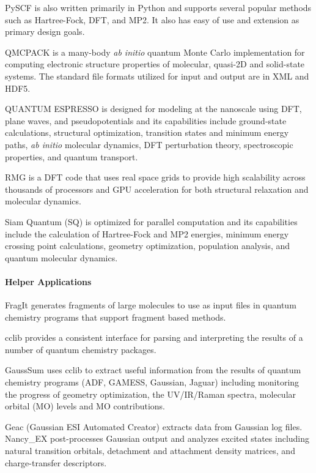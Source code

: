 PySCF is also written primarily in Python and supports several popular methods such as Hartree-Fock, DFT, and MP2. It also has easy of use and extension as primary design goals.

QMCPACK \cite{kim2010quantum} is a many-body \textit{ab initio} quantum Monte Carlo implementation for computing electronic structure properties of molecular, quasi-2D and solid-state systems. The standard file formats utilized for input and output are in XML and HDF5.

QUANTUM ESPRESSO \cite{Giannozzi_2009} is designed for modeling at the nanoscale using DFT, plane waves, and pseudopotentials and its capabilities include ground-state calculations, structural optimization, transition states and minimum energy paths, \textit{ab initio} molecular dynamics, DFT perturbation theory, spectroscopic properties, and quantum transport.

RMG \cite{moore2012scaling} is a DFT code that uses real space grids to provide high scalability across thousands of processors and GPU acceleration for both structural relaxation and molecular dynamics.

Siam Quantum (SQ) is optimized for parallel computation and its capabilities include the calculation of Hartree-Fock and MP2 energies, minimum energy crossing point calculations, geometry optimization, population analysis, and quantum molecular dynamics.


\paragraph{Helper Applications}
FragIt \cite{Steinmann_2012} generates fragments of large molecules to use as input files in quantum chemistry programs that support fragment based methods.

cclib \cite{O_boyle_2008} provides a consistent interface for parsing and interpreting the results of a number of quantum chemistry packages. 

GaussSum \cite{O_boyle_2008} uses cclib to extract useful information from the results of quantum chemistry programs (ADF, GAMESS, Gaussian, Jaguar) including monitoring the progress of geometry optimization, the UV/IR/Raman spectra, molecular orbital (MO) levels and MO contributions.

Geac (Gaussian ESI Automated Creator) extracts data from Gaussian log files. 
Nancy\_EX \cite{Etienne_2014} post-processes Gaussian output and analyzes excited states including natural transition orbitals, detachment and attachment density matrices, and charge-transfer descriptors.

